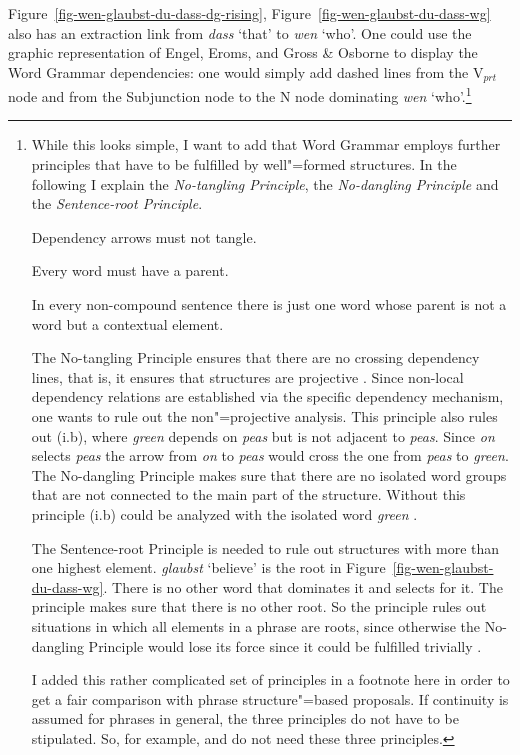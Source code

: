 Figure~\ref{fig-wen-glaubst-du-dass-dg-rising}, Figure~\ref{fig-wen-glaubst-du-dass-wg} also has an
extraction link from \emph{dass} `that' to \emph{wen} `who'. One could use the graphic representation of Engel,
Eroms, and Gross \& Osborne to display the Word Grammar dependencies: one would simply add dashed
lines from the V$_{prt}$ node and from the Subjunction node to the N node dominating \emph{wen}
`who'.\footnote{
While this looks simple, I want to add that Word Grammar employs further principles that have to be
fulfilled by well"=formed  structures. In the following I explain the \emph{No-tangling Principle},
the \emph{No-dangling Principle} and the \emph{Sentence-root Principle}.
\begin{principle}
  Dependency arrows must not tangle.
\end{principle}

\begin{principle}
Every word must have a parent.
\end{principle}

\begin{principle}
In every non-compound sentence there is just one word whose parent
is not a word but a contextual element.
\end{principle}

The No-tangling Principle ensures that there are no crossing dependency lines, that is, it ensures
that structures are projective \citep[]{Hudson2000a}. Since non-local dependency relations are established via the
specific dependency mechanism, one wants to rule out the non"=projective analysis. This principle
also rules out (i.b), where \emph{green} depends on \emph{peas} but is not adjacent to
\emph{peas}. Since \emph{on} selects \emph{peas} the arrow from \emph{on} to \emph{peas} would cross
the one from \emph{peas} to \emph{green}.
\eal
{}
\zl
The No-dangling Principle makes sure that there are no isolated word groups that are not connected to the main part
of the structure. Without this principle (i.b) could be analyzed with the isolated word
\emph{green} \citep[]{Hudson2000a}.

The Sentence-root Principle is needed to rule out structures with more than one highest
element. \emph{glaubst} `believe' is the root in Figure~\ref{fig-wen-glaubst-du-dass-wg}. There is
no other word that dominates it and selects for it. The principle makes sure that there is no other
root. So the principle rules out situations in which all elements in a phrase are roots, since
otherwise the No-dangling Principle would lose its force since it could be fulfilled trivially \citep[]{Hudson2000a}.

I added this rather complicated set of principles in a footnote here in order to get a fair
comparison with phrase structure"=based proposals. If continuity is assumed for phrases in general,
the three principles do not have to be stipulated. So, for example, \lfg and \hpsg
do not need these three principles.
}

